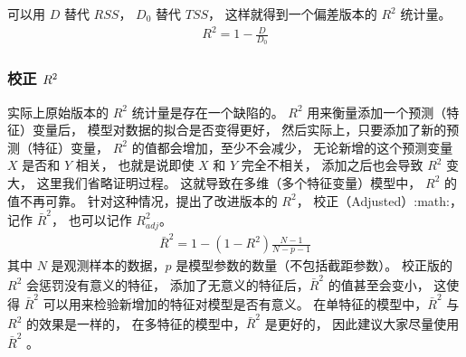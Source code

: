 \documentclass[letterpaper,10pt,english]{sphinxmanual}
\begin{document}
可以用 \(D\) 替代 \(RSS\)，
\(D_0\) 替代 \(TSS\)，
这样就得到一个偏差版本的 \(R^2\) 统计量。
\begin{equation}\label{equation:模型评估/content:模型评估/content:20}
\begin{split}R^2 = 1- \frac{D}{D_0}\end{split}
\end{equation}


\subsubsection{校正 \protect\(R^2\protect\)}
\label{\detokenize{_u6a21_u578b_u8bc4_u4f30/content:id7}}
实际上原始版本的 \(R^2\) 统计量是存在一个缺陷的。
\(R^2\) 用来衡量添加一个预测（特征）变量后，
模型对数据的拟合是否变得更好，
然后实际上，只要添加了新的预测（特征）变量，
\(R^2\) 的值都会增加，至少不会减少，
无论新增的这个预测变量 \(X\) 是否和 \(Y\) 相关，
也就是说即使 \(X\) 和 \(Y\) 完全不相关，
添加之后也会导致 \(R^2\) 变大，
这里我们省略证明过程。
这就导致在多维（多个特征变量）模型中，
\(R^2\) 的值不再可靠。
针对这种情况，提出了改进版本的 \(R^2\)，
校正（Adjusted）:math:，
记作 \(\bar{R}^2\)，
也可以记作 \(R^2_{adj}\)。
\begin{equation}\label{equation:模型评估/content:模型评估/content:21}
\begin{split}\bar{R}^2 = 1-(1-R^2)\frac{N-1}{N-p-1}\end{split}
\end{equation}
其中 \(N\) 是观测样本的数据，\(p\) 是模型参数的数量（不包括截距参数）。
校正版的 \(R^2\) 会惩罚没有意义的特征，
添加了无意义的特征后，\(\bar{R}^2\) 的值甚至会变小，
这使得 \(\bar{R}^2\) 可以用来检验新增加的特征对模型是否有意义。
在单特征的模型中，\(\bar{R}^2\) 与 \(R^2\) 的效果是一样的，
在多特征的模型中，\(\bar{R}^2\) 是更好的，
因此建议大家尽量使用 \(\bar{R}^2\) 。
\end{document}
